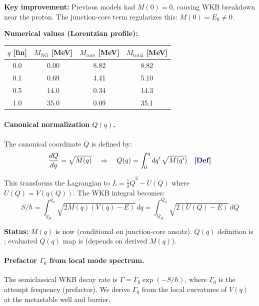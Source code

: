 \textbf{Key improvement:} Previous models had $M(0) = 0$, causing WKB breakdown near the proton.
The junction-core term regularizes this: $M(0) = E_0 \neq 0$.

\textbf{Numerical values (Lorentzian profile):}
\begin{center}
\small
\begin{tabular}{cccc}
\toprule
$q$ [fm] & $M_{\mathrm{NG}}$ [MeV] & $M_{\mathrm{core}}$ [MeV] & $M_{\mathrm{total}}$ [MeV] \\
\midrule
0.0 & 0.00 & 8.82 & 8.82 \\
0.1 & 0.69 & 4.41 & 5.10 \\
0.5 & 14.0 & 0.34 & 14.3 \\
1.0 & 35.0 & 0.09 & 35.1 \\
\bottomrule
\end{tabular}
\end{center}

\paragraph{Canonical normalization $Q(q)$.}
\label{par:Q_canonical}

The canonical coordinate $Q$ is defined by:
\begin{equation}
\frac{dQ}{dq} = \sqrt{M(q)} \quad\Rightarrow\quad Q(q) = \int_0^q dq'\, \sqrt{M(q')}
\quad \text{\tagDef{}}
\label{eq:Q_canonical}
\end{equation}

This transforms the Lagrangian to $L = \frac{1}{2}\dot{Q}^2 - U(Q)$ where $U(Q) = V(q(Q))$.
The WKB integral becomes:
\begin{equation}
S/\hbar = \int_{q_B}^{q_n} \sqrt{2M(q)(V(q)-E)}\,dq
= \int_{Q_B}^{Q_n} \sqrt{2(U(Q)-E)}\,dQ
\end{equation}

\textbf{Status:} $M(q)$ is now \tagDc{} (conditional on junction-core ansatz).
$Q(q)$ definition is \tagDef{}; evaluated $Q(q)$ map is \tagDc{} (depends on derived $M(q)$).

\paragraph{Prefactor $\Gamma_0$ from local mode spectrum.}
\label{par:Gamma0_prefactor}

The semiclassical WKB decay rate is $\Gamma = \Gamma_0 \exp(-S/\hbar)$, where $\Gamma_0$
is the attempt frequency (prefactor). We derive $\Gamma_0$ from the local curvatures of
$V(q)$ at the metastable well and barrier.


